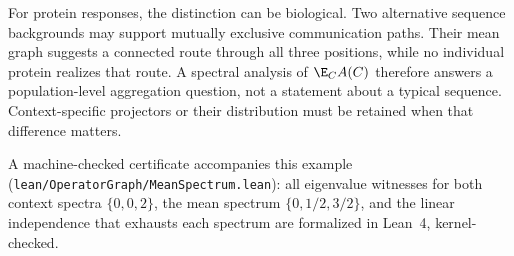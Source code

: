 For protein responses, the distinction can be biological.  Two alternative sequence backgrounds
may support mutually exclusive communication paths.  Their mean graph suggests a connected route
through all three positions, while no individual protein realizes that route.  A spectral analysis
of $\E_C A(C)$ therefore answers a population-level aggregation question, not a statement about a
typical sequence.  Context-specific projectors or their distribution must be retained when that
difference matters.

A machine-checked certificate accompanies this example
(\texttt{lean/OperatorGraph/MeanSpectrum.lean}): all eigenvalue witnesses
for both context spectra $\{0,0,2\}$, the mean spectrum
$\{0,1/2,3/2\}$, and the linear independence that exhausts each spectrum
are formalized in Lean~4, kernel-checked.
